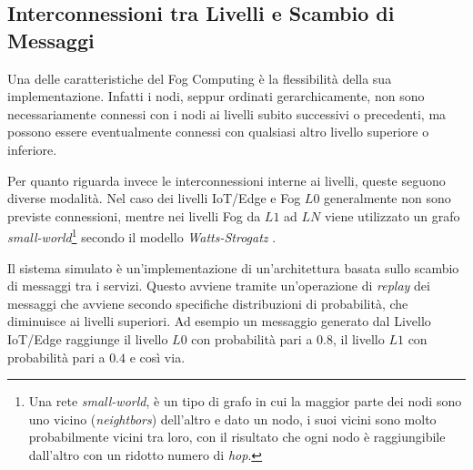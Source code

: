 \subsection{Interconnessioni tra Livelli e Scambio di Messaggi}

Una delle caratteristiche del Fog Computing è la flessibilità della sua implementazione. Infatti i nodi, seppur ordinati gerarchicamente, non sono necessariamente connessi con i nodi ai livelli subito successivi o precedenti, ma possono essere eventualmente connessi con qualsiasi altro livello superiore o inferiore. 

Per quanto riguarda invece le interconnessioni interne ai livelli, queste seguono diverse modalità. Nel caso dei livelli IoT/Edge e Fog $L0$ generalmente non sono previste connessioni, mentre nei livelli Fog da $L1$ ad $LN$ viene utilizzato un grafo \textit{small-world}\footnote{Una rete \textit{small-world}, è un tipo di grafo in cui la maggior parte dei nodi sono uno vicino (\textit{neightbors}) dell'altro e dato un nodo, i suoi vicini sono molto probabilmente vicini tra loro, con il risultato che ogni nodo è raggiungibile dall'altro con un ridotto numero di \textit{hop}.} secondo il modello \textit{Watts-Strogatz} \cite{WattsStrogatzModel}.

Il sistema simulato è un'implementazione di un'architettura basata sullo scambio di messaggi tra i servizi. Questo avviene tramite un'operazione di \textit{replay} dei messaggi che avviene secondo specifiche distribuzioni di probabilità, che diminuisce ai livelli superiori. Ad esempio un messaggio generato dal Livello IoT/Edge raggiunge il livello $L0$ con probabilità pari a $0.8$, il livello $L1$ con probabilità pari a $0.4$ e così via.



















